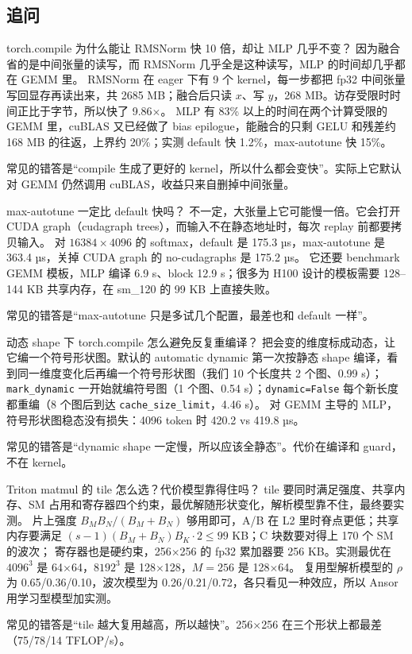 \documentclass[11pt,a4paper]{ctexart}
\begin{document}
\subsection{追问}

\begin{iqbox}{torch.compile 为什么能让 RMSNorm 快 10 倍，却让 MLP 几乎不变？}
因为融合省的是中间张量的读写，而 RMSNorm 几乎全是这种读写，MLP 的时间却几乎都在 GEMM 里。
RMSNorm 在 eager 下有 9 个 kernel，每一步都把 fp32 中间张量写回显存再读出来，共 2685 MB；融合后只读 $x$、写 $y$，268 MB。访存受限时时间正比于字节，所以快了 9.86$\times$。
MLP 有 83\% 以上的时间在两个计算受限的 GEMM 里，cuBLAS 又已经做了 bias epilogue，能融合的只剩 GELU 和残差约 168 MB 的往返，上界约 20\%；实测 default 快 1.2\%，max-autotune 快 15\%。

常见的错答是“compile 生成了更好的 kernel，所以什么都会变快”。实际上它默认对 GEMM 仍然调用 cuBLAS，收益只来自删掉中间张量。
\end{iqbox}

\begin{iqbox}{max-autotune 一定比 default 快吗？}
不一定，大张量上它可能慢一倍。它会打开 CUDA graph（cudagraph trees），而输入不在静态地址时，每次 replay 前都要拷贝输入。
对 $16384\times4096$ 的 softmax，default 是 175.3 µs，max-autotune 是 363.4 µs，关掉 CUDA graph 的 no-cudagraphs 是 175.2 µs。
它还要 benchmark GEMM 模板，MLP 编译 6.9 s、block 12.9 s；很多为 H100 设计的模板需要 128--144 KB 共享内存，在 sm\_120 的 99 KB 上直接失败。

常见的错答是“max-autotune 只是多试几个配置，最差也和 default 一样”。
\end{iqbox}

\begin{iqbox}{动态 shape 下 torch.compile 怎么避免反复重编译？}
把会变的维度标成动态，让它编一个符号形状图。默认的 automatic dynamic 第一次按静态 shape 编译，看到同一维度变化后再编一个符号形状图（我们 10 个长度共 2 个图、0.99 s）；
\texttt{mark\_dynamic} 一开始就编符号图（1 个图、0.54 s）；\texttt{dynamic=False} 每个新长度都重编（8 个图后到达 \texttt{cache\_size\_limit}，4.46 s）。
对 GEMM 主导的 MLP，符号形状图稳态没有损失：4096 token 时 420.2 vs 419.8 µs。

常见的错答是“dynamic shape 一定慢，所以应该全静态”。代价在编译和 guard，不在 kernel。
\end{iqbox}

\begin{iqbox}{Triton matmul 的 tile 怎么选？代价模型靠得住吗？}
tile 要同时满足强度、共享内存、SM 占用和寄存器四个约束，最优解随形状变化，解析模型靠不住，最终要实测。
片上强度 $B_MB_N/(B_M+B_N)$ 够用即可，A/B 在 L2 里时脊点更低；共享内存要满足 $(s-1)(B_M+B_N)B_K\cdot2\le99$ KB；C 块数要对得上 170 个 SM 的波次；
寄存器也是硬约束，256$\times$256 的 fp32 累加器要 256 KB。实测最优在 $4096^3$ 是 64$\times$64，$8192^3$ 是 128$\times$128，$M{=}256$ 是 128$\times$64。
复用型解析模型的 $\rho$ 为 0.65/0.36/0.10，波次模型为 0.26/0.21/0.72，各只看见一种效应，所以 Ansor 用学习型模型加实测。

常见的错答是“tile 越大复用越高，所以越快”。256$\times$256 在三个形状上都最差（75/78/14 TFLOP/s）。
\end{iqbox}
\end{document}
